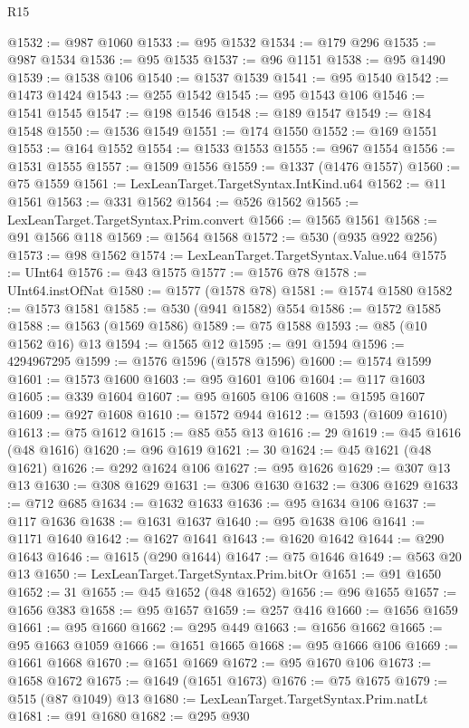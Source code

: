 \begin{lexlean}{R15}
\begin{coremodule}
@1532 := @987 @1060
@1533 := @95 @1532
@1534 := @179 @296
@1535 := @987 @1534
@1536 := @95 @1535
@1537 := @96 @1151
@1538 := @95 @1490
@1539 := @1538 @106
@1540 := @1537 @1539
@1541 := @95 @1540
@1542 := @1473 @1424
@1543 := @255 @1542
@1545 := @95 @1543 @106
@1546 := @1541 @1545
@1547 := @198 @1546
@1548 := @189 @1547
@1549 := @184 @1548
@1550 := @1536 @1549
@1551 := @174 @1550
@1552 := @169 @1551
@1553 := @164 @1552
@1554 := @1533 @1553
@1555 := @967 @1554
@1556 := @1531 @1555
@1557 := @1509 @1556
@1559 := @1337 (@1476 @1557)
@1560 := @75 @1559
@1561 := LexLeanTarget.TargetSyntax.IntKind.u64
@1562 := @11 @1561
@1563 := @331 @1562
@1564 := @526 @1562
@1565 := LexLeanTarget.TargetSyntax.Prim.convert
@1566 := @1565 @1561
@1568 := @91 @1566 @118
@1569 := @1564 @1568
@1572 := @530 (@935 @922 @256)
@1573 := @98 @1562
@1574 := LexLeanTarget.TargetSyntax.Value.u64
@1575 := UInt64
@1576 := @43 @1575
@1577 := @1576 @78
@1578 := UInt64.instOfNat
@1580 := @1577 (@1578 @78)
@1581 := @1574 @1580
@1582 := @1573 @1581
@1585 := @530 (@941 @1582) @554
@1586 := @1572 @1585
@1588 := @1563 (@1569 @1586)
@1589 := @75 @1588
@1593 := @85 (@10 @1562 @16) @13
@1594 := @1565 @12
@1595 := @91 @1594
@1596 := 4294967295
@1599 := @1576 @1596 (@1578 @1596)
@1600 := @1574 @1599
@1601 := @1573 @1600
@1603 := @95 @1601 @106
@1604 := @117 @1603
@1605 := @339 @1604
@1607 := @95 @1605 @106
@1608 := @1595 @1607
@1609 := @927 @1608
@1610 := @1572 @944
@1612 := @1593 (@1609 @1610)
@1613 := @75 @1612
@1615 := @85 @55 @13
@1616 := 29
@1619 := @45 @1616 (@48 @1616)
@1620 := @96 @1619
@1621 := 30
@1624 := @45 @1621 (@48 @1621)
@1626 := @292 @1624 @106
@1627 := @95 @1626
@1629 := @307 @13 @13
@1630 := @308 @1629
@1631 := @306 @1630
@1632 := @306 @1629
@1633 := @712 @685
@1634 := @1632 @1633
@1636 := @95 @1634 @106
@1637 := @117 @1636
@1638 := @1631 @1637
@1640 := @95 @1638 @106
@1641 := @1171 @1640
@1642 := @1627 @1641
@1643 := @1620 @1642
@1644 := @290 @1643
@1646 := @1615 (@290 @1644)
@1647 := @75 @1646
@1649 := @563 @20 @13
@1650 := LexLeanTarget.TargetSyntax.Prim.bitOr
@1651 := @91 @1650
@1652 := 31
@1655 := @45 @1652 (@48 @1652)
@1656 := @96 @1655
@1657 := @1656 @383
@1658 := @95 @1657
@1659 := @257 @416
@1660 := @1656 @1659
@1661 := @95 @1660
@1662 := @295 @449
@1663 := @1656 @1662
@1665 := @95 @1663 @1059
@1666 := @1651 @1665
@1668 := @95 @1666 @106
@1669 := @1661 @1668
@1670 := @1651 @1669
@1672 := @95 @1670 @106
@1673 := @1658 @1672
@1675 := @1649 (@1651 @1673)
@1676 := @75 @1675
@1679 := @515 (@87 @1049) @13
@1680 := LexLeanTarget.TargetSyntax.Prim.natLt
@1681 := @91 @1680
@1682 := @295 @930

\end{coremodule}
\end{lexlean}
